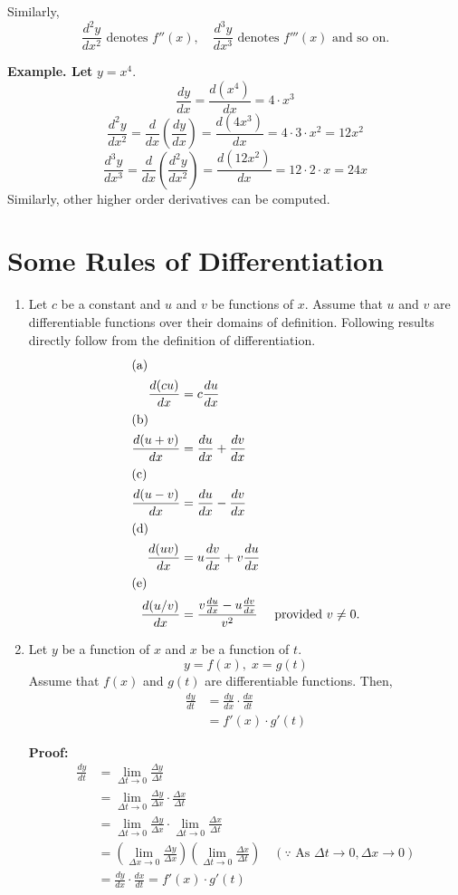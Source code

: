 
Similarly, 
\[
\frac{d^2 y}{dx^2} \text{ denotes } f''(x), \quad \frac{d^3 y}{dx^3} \text{ denotes } f'''(x) \text{ and so on.}
\]

\textbf{Example. Let } $y = x^4$.
\[
\frac{dy}{dx} = \frac{d(x^4)}{dx} = 4 \cdot x^3
\]
\[
\frac{d^2 y}{dx^2} = \frac{d}{dx} \left( \frac{dy}{dx} \right) = \frac{d(4x^3)}{dx} = 4 \cdot 3 \cdot x^2 = 12x^2
\]
\[
\frac{d^3 y}{dx^3} = \frac{d}{dx} \left( \frac{d^2 y}{dx^2} \right) = \frac{d(12x^2)}{dx} = 12 \cdot 2 \cdot x = 24x
\]
Similarly, other higher order derivatives can be computed.

\section*{Some Rules of Differentiation}
\begin{enumerate}
    \item Let $c$ be a constant and $u$ and $v$ be functions of $x$. Assume that $u$ and $v$ are differentiable functions over their domains of definition. Following results directly follow from the definition of differentiation.
    \begin{align*}
        \intertext{(a) } \frac{d(cu)}{dx} & = c \frac{du}{dx} \\
        \intertext{(b) } \frac{d(u + v)}{dx} & = \frac{du}{dx} + \frac{dv}{dx} \\
        \intertext{(c) } \frac{d(u - v)}{dx} & = \frac{du}{dx} - \frac{dv}{dx} \\
        \intertext{(d) } \frac{d(uv)}{dx} & = u \frac{dv}{dx} + v \frac{du}{dx} \\
        \intertext{(e) } \frac{d(u/v)}{dx} & = \frac{v \frac{du}{dx} - u \frac{dv}{dx}}{v^2} \quad \text{ provided } v \ne 0.
    \end{align*}
    \item Let $y$ be a function of $x$ and $x$ be a function of $t$.
    \[
    y = f(x), \; x = g(t)
    \]
    Assume that $f(x)$ and $g(t)$ are differentiable functions. Then,
    \begin{align*}
        \frac{dy}{dt} & = \frac{dy}{dx} \cdot \frac{dx}{dt} \\
        & = f'(x) \cdot g'(t)
    \end{align*}

    \textbf{Proof:}
    \begin{align*}
        \frac{dy}{dt} & = \lim_{\Delta t \to 0} \frac{\Delta y}{\Delta t} \\
        & = \lim_{\Delta t \to 0} \frac{\Delta y}{\Delta x} \cdot \frac{\Delta x}{\Delta t} \\
        & = \lim_{\Delta t \to 0} \frac{\Delta y}{\Delta x} \cdot \lim_{\Delta t \to 0} \frac{\Delta x}{\Delta t} \\
        & = \left( \lim_{\Delta x \to 0} \frac{ \Delta y}{\Delta x} \right) \left( \lim_{\Delta t \to 0} \frac{ \Delta x}{\Delta t} \right) \quad (\text{$\because$~As } \Delta t \to 0, \Delta x \to 0) \\
        & = \frac{dy}{dx} \cdot \frac{dx}{dt} = f'(x) \cdot g'(t)
    \end{align*}
\end{enumerate}
